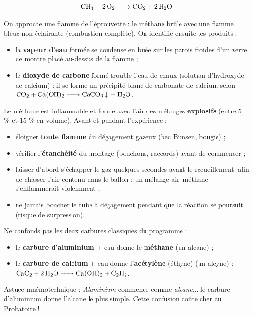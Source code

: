 \documentclass[11pt]{article}
\newcommand{\cle}[1]{{\popxbold\color{popdark}#1}}
\begin{document}
\[ \ce{CH4 + 2 O2 -> CO2 + 2 H2O} \]

On approche une flamme de l'éprouvette : le méthane brûle avec une \cle{flamme bleue} non éclairante (combustion complète). On identifie ensuite les produits :
\begin{itemize}
\item la \textbf{vapeur d'eau} formée se condense en buée sur les parois froides d'un verre de montre placé au-dessus de la flamme ;
\item le \textbf{dioxyde de carbone} formé \cle{trouble l'eau de chaux} (solution d'hydroxyde de calcium) : il se forme un précipité blanc de carbonate de calcium selon $\ce{CO2 + Ca(OH)2 -> CaCO3 v + H2O}$.
\end{itemize}

\begin{attention}
Le méthane est inflammable et forme avec l'air des mélanges \textbf{explosifs} (entre 5 \% et 15 \% en volume). Avant et pendant l'expérience :
\begin{itemize}
\item éloigner \textbf{toute flamme} du dégagement gazeux (bec Bunsen, bougie) ;
\item vérifier l'\textbf{étanchéité} du montage (bouchons, raccords) avant de commencer ;
\item laisser d'abord s'échapper le gaz quelques secondes avant le recueillement, afin de chasser l'air contenu dans le ballon : un mélange air--méthane s'enflammerait violemment ;
\item ne jamais boucher le tube à dégagement pendant que la réaction se poursuit (risque de surpression).
\end{itemize}
\end{attention}

\begin{attention}
Ne confonds pas les deux carbures classiques du programme :
\begin{itemize}
\item le \textbf{carbure d'aluminium}  + eau donne le \textbf{méthane}  (un alcane) ;
\item le \textbf{carbure de calcium}  + eau donne l'\textbf{acétylène} (éthyne)  (un alcyne) : $\ce{CaC2 + 2 H2O -> Ca(OH)2 + C2H2}$.
\end{itemize}
Astuce mnémotechnique : \emph{Aluminium} commence comme \emph{alcane}... le carbure d'aluminium donne l'alcane le plus simple. Cette confusion coûte cher au Probatoire !
\end{attention}
\end{document}
